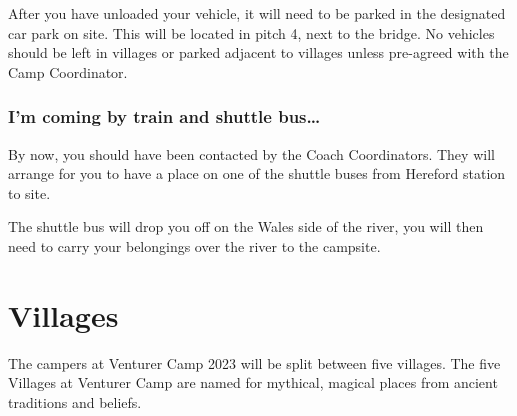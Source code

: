 \documentclass[a4paper, 11pt]{report}
\begin{document}
After you have unloaded your vehicle, it will need to be parked in the designated car park on site. This will be located in pitch 4, next to the bridge. No vehicles should be left in villages or parked adjacent to villages unless pre-agreed with the Camp Coordinator.

\subsection{I'm coming by train and shuttle bus\ldots}
By now, you should have been contacted by the Coach Coordinators. They will arrange for you to have a place on one of the shuttle buses from Hereford station to site.\nl

The shuttle bus will drop you off on the Wales side of the river, you will then need to carry your belongings over the river to the campsite. 

\chapter{Villages}
The campers at Venturer Camp 2023 will be split between five villages.  The five Villages at Venturer Camp are named for mythical, magical places from ancient traditions and beliefs.
\end{document}
